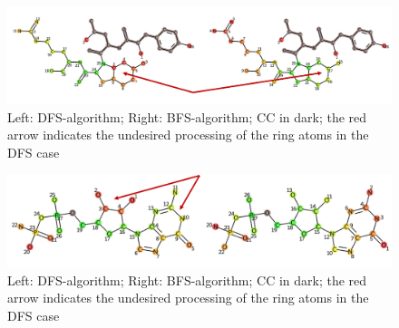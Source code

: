 \begin{figure}

\includegraphics[scale=0.45]{2ring_example}\caption{Left: DFS-algorithm; Right: BFS-algorithm; CC in dark; the
red arrow indicates the undesired processing of the ring atoms in the DFS case}
\label{fig:2ring_example}
\end{figure}

\begin{figure}

\includegraphics[scale=0.4]{2ring_example2}\caption{Left: DFS-algorithm; Right: BFS-algorithm; CC in dark; the
red arrow indicates the undesired processing of the ring atoms in the DFS case}
\label{fig:2ring_example2}
\end{figure}
